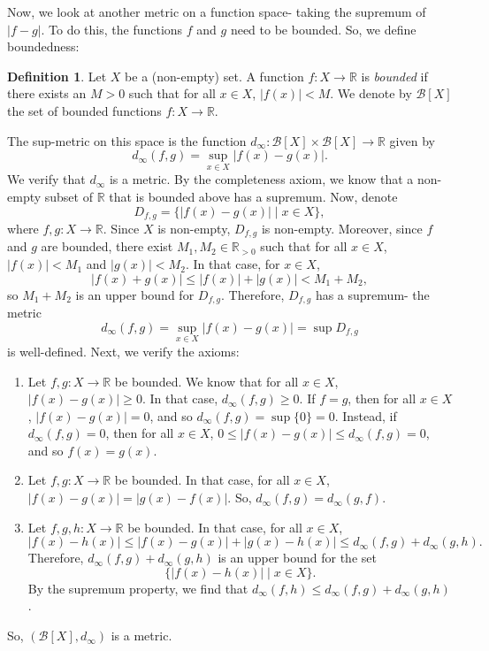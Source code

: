 \documentclass[a4paper, openany]{memoir}
\theoremstyle{definition}
\newtheorem{definition}{Definition}[section]
\theoremstyle{plain}
\begin{document}
Now, we look at another metric on a function space- taking the supremum of $|f-g|$. To do this, the functions $f$ and $g$ need to be bounded. So, we define boundedness:
\begin{definition}
Let $X$ be a (non-empty) set. A function $f: X \to \mathbb{R}$ is \emph{bounded} if there exists an $M > 0$ such that for all $x \in X$, $|f(x)| < M$. We denote by $\mathcal{B}[X]$ the set of bounded functions $f: X \to \mathbb{R}$. 
\end{definition}
The sup-metric on this space is the function $d_\infty: \mathcal{B}[X] \times \mathcal{B}[X] \to \mathbb{R}$ given by
\[d_\infty(f, g) = \sup_{x \in X} |f(x) - g(x)|.\]
We verify that $d_\infty$ is a metric. By the completeness axiom, we know that a non-empty subset of $\mathbb{R}$ that is bounded above has a supremum. Now, denote
\[D_{f, g} = \{|f(x) - g(x)| \mid x \in X\},\]
where $f, g: X \to \mathbb{R}$. Since $X$ is non-empty, $D_{f, g}$ is non-empty. Moreover, since $f$ and $g$ are bounded, there exist $M_1, M_2 \in \mathbb{R}_{> 0}$ such that for all $x \in X$, $|f(x)| < M_1$ and $|g(x)| < M_2$. In that case, for $x \in X$,
\[|f(x) + g(x)| \leqslant |f(x)| + |g(x)| < M_1 + M_2,\]
so $M_1 + M_2$ is an upper bound for $D_{f, g}$. Therefore, $D_{f, g}$ has a supremum- the metric 
\[d_\infty(f, g) = \sup_{x \in X} |f(x) - g(x)| = \sup D_{f, g}\]
is well-defined. Next, we verify the axioms:
\begin{enumerate}[label=\textbf{M\arabic*}.]
    \item Let $f, g: X \to \mathbb{R}$ be bounded. We know that for all $x \in X$, $|f(x) - g(x)| \geqslant 0$. In that case, $d_\infty(f, g) \geqslant 0$. If $f = g$, then for all $x \in X$, $|f(x) - g(x)| = 0$, and so $d_\infty(f, g) = \sup \{0\} = 0$. Instead, if $d_\infty(f, g) = 0$, then for all $x \in X$, $0 \leqslant |f(x) - g(x)| \leqslant d_\infty(f, g) = 0$, and so $f(x) = g(x)$.
    
    \item Let $f, g: X \to \mathbb{R}$ be bounded. In that case, for all $x \in X$, $|f(x) - g(x)| = |g(x) - f(x)|$. So, $d_\infty(f, g) = d_\infty(g, f)$.
    
    \item Let $f, g, h: X \to \mathbb{R}$ be bounded. In that case, for all $x \in X$,
    \[|f(x) - h(x)| \leqslant |f(x) - g(x)| + |g(x) - h(x)| \leqslant d_\infty(f, g) + d_\infty(g, h).\]
    Therefore, $d_\infty(f, g) + d_\infty(g, h)$ is an upper bound for the set
    \[\{|f(x) - h(x)| \mid x \in X\}.\]
    By the supremum property, we find that $d_\infty(f, h) \leqslant d_\infty(f, g) + d_\infty(g, h)$.
\end{enumerate}
So, $(\mathcal{B}[X], d_\infty)$ is a metric.
\end{document}

